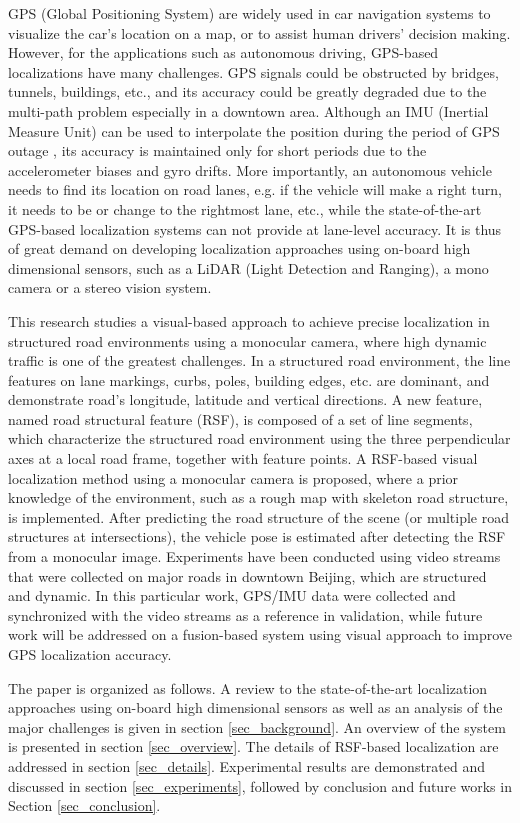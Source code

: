 \documentclass[letterpaper, 10 pt, conference]{ieeeconf}  %
\begin{document}
GPS (Global Positioning System) are widely used in car navigation systems to visualize the car's location on a map, or to assist human drivers' decision making.
However, for the applications such as autonomous driving, GPS-based localizations have many challenges.
GPS signals could be obstructed by bridges, tunnels, buildings, etc., and its accuracy could be greatly degraded due to the multi-path problem especially in a downtown area. Although an IMU (Inertial Measure Unit) can be used to interpolate the position during the period of GPS outage \cite{caron2006gps}, its accuracy is maintained only for short periods due to the accelerometer biases and gyro drifts.
More importantly, an autonomous vehicle needs to find its location on road lanes, e.g. if the vehicle will make a right turn, it needs to be or change to the rightmost lane, etc., while the state-of-the-art GPS-based localization systems can not provide at lane-level accuracy. It is thus of great demand on developing localization approaches using on-board high dimensional sensors, such as a LiDAR (Light Detection and Ranging), a mono camera or a stereo vision system.

This research studies a visual-based approach to achieve precise localization in structured road environments using a monocular camera, where high dynamic traffic is one of the greatest challenges. In a structured road environment, the line features on lane markings, curbs, poles, building edges, etc. are dominant, and demonstrate road's longitude, latitude and vertical directions.
A new feature, named road structural feature (RSF), is composed of a set of line segments, which characterize the structured road environment using the three perpendicular axes at a local road frame, together with feature points.
A RSF-based visual localization method using a monocular camera is proposed, where a prior knowledge of the environment, such as a rough map with skeleton road structure, is implemented. After predicting the road structure of the scene (or multiple road structures at intersections), the vehicle pose is estimated after detecting the RSF from a monocular image.
Experiments have been conducted using video streams that were collected on major roads in downtown Beijing, which are structured and dynamic. In this particular work, GPS/IMU data were collected and synchronized with the video streams as a reference in validation, while future work will be addressed on a fusion-based system using visual approach to improve GPS localization accuracy.

The paper is organized as follows. A review to the state-of-the-art localization approaches using on-board high dimensional sensors as well as an analysis of the major challenges is given in section \ref{sec_background}. An overview of the system is presented in section  \ref{sec_overview}. The details of RSF-based localization are addressed in section \ref{sec_details}. Experimental results are demonstrated and discussed in section \ref{sec_experiments}, followed by conclusion and future works in Section  \ref{sec_conclusion}.
\end{document}
